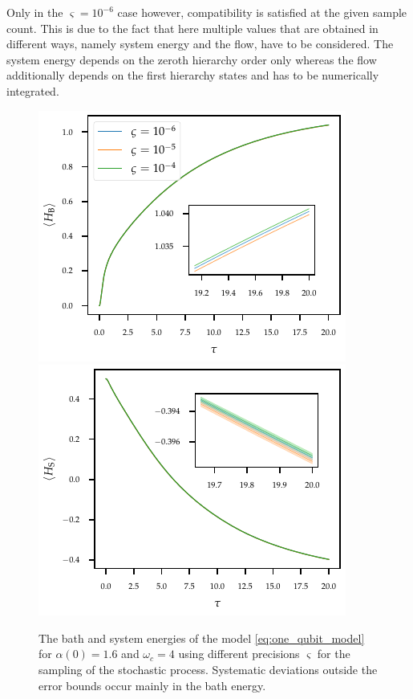 Only in the \(\varsigma=10^{-6}\) case however, compatibility is
satisfied at the given sample count. This is due to the fact that here
multiple values that are obtained in different ways, namely system
energy and the flow, have to be considered. The system energy depends
on the zeroth hierarchy order only whereas the flow additionally
depends on the first hierarchy states and has to be numerically
integrated.
\begin{figure}[hp]
  \centering
  \includegraphics{figs/one_bath_syst/stocproc_systematics_bath_energy}
  \includegraphics{figs/one_bath_syst/stocproc_systematics_system}
  \caption{\label{fig:stocproc_bath_sys}The bath and system energies of the
    model \cref{eq:one_qubit_model} for \(α(0)=1.6\) and \(ω_c=4\)
    using different precisions \(\varsigma\) for the sampling of the
    stochastic process. Systematic deviations outside the error bounds
  occur mainly in the bath energy.}
\end{figure}

